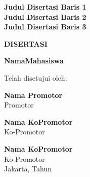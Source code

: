 \newpage
{}


\begin{center}

\textbf{{\fontsize{14}{15}\selectfont Judul Disertasi Baris 1}}\\
\textbf{{\fontsize{14}{15}\selectfont Judul Disertasi Baris 2}}\\
\textbf{{\fontsize{14}{15}\selectfont Judul Disertasi Baris 3}}\\



\vspace{1cm}

\textbf{{\normalsize DISERTASI}}

\vspace{1cm}

\textbf{{\normalsize NamaMahasiswa}}



\vspace{1cm}

Telah disetujui oleh:

\vspace{2.5cm}

{\bf Nama Promotor}\\
Promotor

\vspace{2.5cm}

{\bf Nama KoPromotor}\\
Ko-Promotor

\vspace{2.5cm}

{\bf Nama KoPromotor}\\
 Ko-Promotor\\
\vspace{1.5cm}
Jakarta, Tahun

\end{center}


